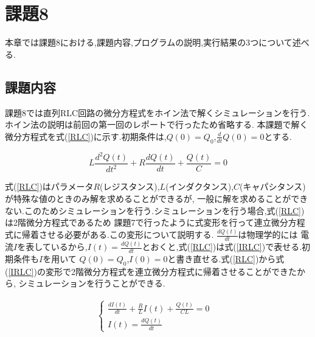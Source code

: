 \documentclass[a4j]{jarticle}
\begin{document}
      \section{課題8}
      本章では課題8における,課題内容,プログラムの説明,実行結果の3つについて述べる.
      \subsection{課題内容}
      課題8では直列RLC回路の微分方程式をホイン法で解くシミュレーションを行う. ホイン法の説明は前回の第一回のレポートで行ったため省略する.
      本課題で解く微分方程式を式(\ref{RLC})に示す.初期条件は,$Q(0)=Q_0$,$\frac{d}{dt}Q(0)=0$とする.

      \begin{equation}
        L \frac{d^2Q(t)}{dt^2}+R \frac{dQ(t)}{dt}+\frac{Q(t)}{C}=0
        \label{RLC}
      \end{equation}

      式(\ref{RLC})はパラメータ$R$(レジスタンス),$L$(インダクタンス),$C$(キャパシタンス)が特殊な値のときのみ解を求めることができるが,
      一般に解を求めることができない.このためシミュレーションを行う.シミュレーションを行う場合,式(\ref{RLC})は2階微分方程式であるため
      課題7で行ったように式変形を行って連立微分方程式に帰着させる必要がある.この変形について説明する. $\frac{dQ(t)}{dt}$は物理学的には
      電流$I$を表しているから,$I(t)=\frac{dQ(t)}{dt}$とおくと,式(\ref{RLC})は式(\ref{IRLC})で表せる.初期条件も$I$を用いて
      $Q(0)=Q_0$,$I(0)=0$と書き直せる.式(\ref{RLC})から式(\ref{IRLC})の変形で2階微分方程式を連立微分方程式に帰着させることができたから,
      シミュレーションを行うことができる.

      \begin{eqnarray}
        \begin{cases}
          \frac{d I(t)}{dt}+\frac{R}{L}I(t)+\frac{Q(t)}{CL}=0 & \\
          I(t)=\frac{dQ(t)}{dt} &
        \end{cases}
        \label{IRLC}
      \end{eqnarray}
\end{document}
